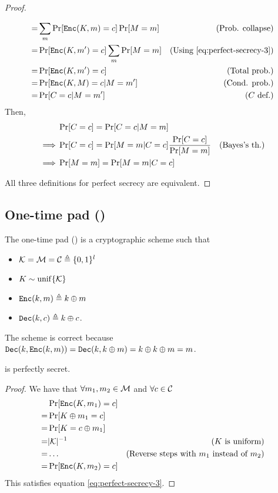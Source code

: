 \begin{proof}
\begin{itemize}
\begin{align*}
            =& \sum_{m}\Pr[\texttt{Enc}(K, m) = c]\Pr[M = m] & \text{(Prob. collapse)} \\
            =& \Pr[\texttt{Enc}(K, m') = c] \sum_{m}\Pr[M = m] & \text{(Using \ref{eq:perfect-secrecy-3})} \\
            =& \Pr[\texttt{Enc}(K, m') = c] & \text{(Total prob.)} \\
            =& \Pr[\texttt{Enc}(K, M) = c|M = m'] & \text{(Cond. prob.)} \\
            =& \Pr[C = c|M = m'] & \text{($C$ def.)}
        \end{align*}
%
        Then,
        \begin{align*}
            & \Pr[C = c] = \Pr[C = c|M = m] & \\
            \implies & \Pr[C = c] = \Pr[M = m|C = c]\frac{\Pr[C = c]}{\Pr[M = m]} & \text{(Bayes's th.)} \\
            \implies& \Pr[M = m] = \Pr[M = m|C = c] &
        \end{align*}
    \end{itemize}
%
    All three definitions for perfect secrecy are equivalent.
\end{proof}


\subsection{One-time pad (\otp)}
The one-time pad (\otp) is a cryptographic scheme such that
\begin{itemize}
	\item $\mathcal{K} = \mathcal{M} = \mathcal{C} \triangleq \{0, 1\}^l$
	\item $K \sim \operatorname{unif}\{\mathcal{K}\}$
    \item $\texttt{Enc}(k, m) \triangleq k \oplus m$
    \item $\texttt{Dec}(k, c) \triangleq k \oplus c$.
\end{itemize}
The scheme is correct because $\texttt{Dec}(k, \texttt{Enc}(k, m)) = \texttt{Dec}(k, k \oplus m) = k \oplus k \oplus m = m$.

\begin{theorem}\label{th:otp}
    \otp{} is perfectly secret.
\end{theorem}
\begin{proof}
    We have that $\forall m_1, m_2 \in \mathcal{M}$ and $\forall c \in \mathcal{C}$
    \begin{align*}
        & \Pr[\texttt{Enc}(K, m_1) = c] & \\
        =& \Pr[K \oplus m_1 = c] & \\
        =& \Pr[K = c \oplus m_1] & \\
        =& |\mathcal{K}|^{-1} & \text{($K$ is uniform)} \\
        =& \dots & \text{(Reverse steps with $m_1$ instead of $m_2$)} \\
        =& \Pr[\texttt{Enc}(K, m_2) = c] &  
    \end{align*}
    This satisfies equation \ref{eq:perfect-secrecy-3}.
\end{proof}

